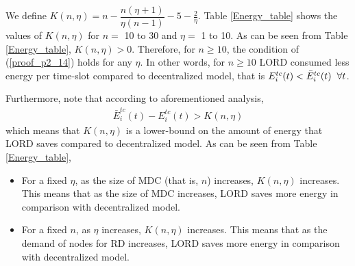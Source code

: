 \documentclass[journal,12pt, onecolumn]{IEEEtran}
\begin{document}
We define $K(n,\eta) =  n - \dfrac{n(\eta +1)}{\eta(n-1)} -5 - \frac{2}{\eta}$. Table \ref{Energy_table} shows the values of $K(n,\eta)$ for $n=$ 10 to 30 and $\eta =$ 1 to 10. As can be seen from Table \ref{Energy_table}, $K(n,\eta)>0$. Therefore, for $n \geq 10$, the condition of (\ref{proof_p2_14}) holds for any $\eta$. In other words,  for $n \geq 10$ LORD consumed less energy per time-slot compared to decentralized model, that is $E_i^{tc}(t)  < \bar{E}_i^{tc}(t)  \hspace{2mm} \forall t$.

Furthermore, note that according to aforementioned analysis, 
\begin{align}
\label{proof_p2_15}
 \bar{E}_i^{tc}(t) - E_i^{tc}(t) > K(n,\eta)
\end{align}
which means that $K(n,\eta)$ is a lower-bound on the amount of energy that LORD saves compared to decentralized model. As can be seen from Table \ref{Energy_table},
\begin{itemize}
\item For a fixed $\eta$, as the size of MDC (that is, $n$) increases, $K(n,\eta)$ increases. This means that as the size of MDC increases, LORD saves more energy in comparison with decentralized model.
\item For a fixed $n$, as $\eta$ increases, $K(n,\eta)$ increases. This means that as the demand of nodes for RD increases, LORD saves more energy in comparison with decentralized model.

\end{itemize}
\end{document}
